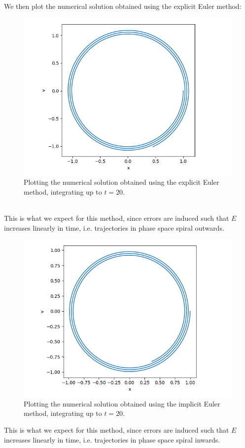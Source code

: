 \documentclass[11pt]{article}
\begin{document}
We then plot the numerical solution obtained using the explicit Euler method:
\begin{figure}[htp]
\centering
\includegraphics[scale=0.80]{euler_phase.png}
\caption{Plotting the numerical solution obtained using the explicit Euler method, integrating up to $t=20$.}
\label{eulphase}
\end{figure}
\\
This is what we expect for this method, since errors are induced such that $E$ increases linearly in time, i.e. trajectories in phase space spiral outwards.
\newpage

\begin{figure}[htp]
\centering
\includegraphics[scale=0.80]{implicit_euler_phase.png}
\caption{Plotting the numerical solution obtained using the implicit Euler method, integrating up to $t=20$.}
\label{impphase}
\end{figure}
This is what we expect for this method, since errors are induced such that $E$ increases linearly in time, i.e. trajectories in phase space spiral inwards.
\end{document}
